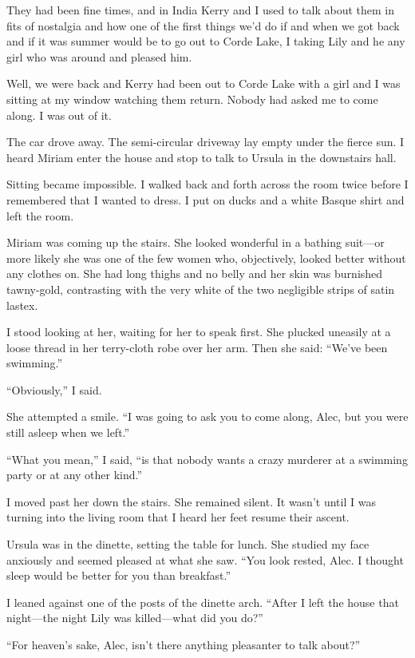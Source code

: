 \documentclass{novel}
\begin{document}
They had been fine times, and in India Kerry and I used to talk about them in fits of nostalgia and how one of the first things we’d do if and when we got back and if it was summer would be to go out to Corde Lake, I taking Lily and he any girl who was around and pleased him.

Well, we were back and Kerry had been out to Corde Lake with a girl and I was sitting at my window watching them return. Nobody had asked me to come along. I was out of it.

The car drove away. The semi-circular driveway lay empty under the fierce sun. I heard Miriam enter the house and stop to talk to Ursula in the downstairs hall.

Sitting became impossible. I walked back and forth across the room twice before I remembered that I wanted to dress. I put on ducks and a white Basque shirt and left the room.

Miriam was coming up the stairs. She looked wonderful in a bathing suit—or more likely she was one of the few women who, objectively, looked better without any clothes on. She had long thighs and no belly and her skin was burnished tawny-gold, contrasting with the very white of the two negligible strips of satin lastex.

I stood looking at her, waiting for her to speak first. She plucked uneasily at a loose thread in her terry-cloth robe over her arm. Then she said: “We’ve been swimming.”

“Obviously,” I said.

She attempted a smile. “I was going to ask you to come along, Alec, but you were still asleep when we left.”

“What you mean,” I said, “is that nobody wants a crazy murderer at a swimming party or at any other kind.”

I moved past her down the stairs. She remained silent. It wasn’t until I was turning into the living room that I heard her feet resume their ascent.

Ursula was in the dinette, setting the table for lunch. She studied my face anxiously and seemed pleased at what she saw. “You look rested, Alec. I thought sleep would be better for you than breakfast.”

I leaned against one of the posts of the dinette arch. “After I left the house that night—the night Lily was killed—what did you do?”

“For heaven’s sake, Alec, isn’t there anything pleasanter to talk about?”
\end{document}
